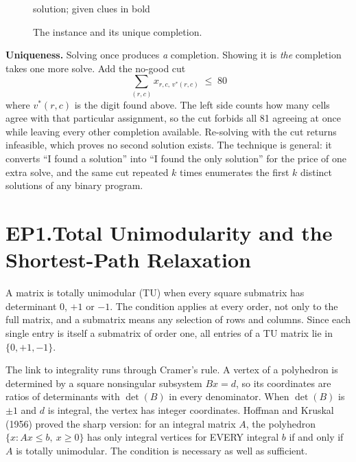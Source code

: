\documentclass[11pt]{article}
\begin{document}
\begin{figure}[htbp]
\begin{minipage}{0.47\textwidth}
\vspace{2mm}
{\small solution; given clues in bold}
\end{minipage}
\caption{The instance and its unique completion.}
\end{figure}

\textbf{Uniqueness.}\quad
Solving once produces \emph{a} completion. Showing it is \emph{the}
completion takes one more solve. Add the no-good cut
\[
  \sum_{(r,c)} x_{r,c,\,v^{*}(r,c)} \;\le\; 80
\]
where $v^{*}(r,c)$ is the digit found above. The left side counts how
many cells agree with that particular assignment, so the cut forbids all
81 agreeing at once while leaving every other completion available.
Re-solving with the cut returns infeasible, which proves no second
solution exists. The technique is general: it converts ``I found a
solution'' into ``I found the only solution'' for the price of one extra
solve, and the same cut repeated $k$ times enumerates the first $k$
distinct solutions of any binary program.

\newpage
\section*{EP1.\quad Total Unimodularity and the Shortest-Path Relaxation}

A matrix is totally unimodular (TU) when every square submatrix has
determinant $0$, $+1$ or $-1$. The condition applies at every order, not
only to the full matrix, and a submatrix means any selection of rows and
columns. Since each single entry is itself a submatrix of order one, all
entries of a TU matrix lie in $\{0, +1, -1\}$.

The link to integrality runs through Cramer's rule. A vertex of a
polyhedron is determined by a square nonsingular subsystem $Bx = d$, so
its coordinates are ratios of determinants with $\det(B)$ in every
denominator. When $\det(B)$ is $\pm 1$ and $d$ is integral, the vertex
has integer coordinates. Hoffman and Kruskal (1956) proved the sharp
version: for an integral matrix $A$, the polyhedron
$\{x : Ax \le b,\ x \ge 0\}$ has only integral vertices for EVERY
integral $b$ if and only if $A$ is totally unimodular. The condition is
necessary as well as sufficient.
\end{document}

